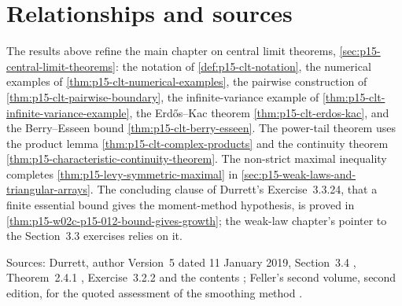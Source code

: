 \section{Relationships and sources}
\label{sec:p15-w02c-p15-015-relationships}

The results above refine the main chapter on central limit theorems,
\cref{sec:p15-central-limit-theorems}: the notation of
\cref{def:p15-clt-notation}, the numerical examples of
\cref{thm:p15-clt-numerical-examples}, the pairwise construction of
\cref{thm:p15-clt-pairwise-boundary}, the infinite-variance example of
\cref{thm:p15-clt-infinite-variance-example}, the Erd\H{o}s--Kac theorem
\cref{thm:p15-clt-erdos-kac}, and the Berry--Esseen bound
\cref{thm:p15-clt-berry-esseen}. The power-tail theorem uses the product
lemma \cref{thm:p15-clt-complex-products} and the continuity theorem
\cref{thm:p15-characteristic-continuity-theorem}. The non-strict maximal
inequality completes \cref{thm:p15-levy-symmetric-maximal} in
\cref{sec:p15-weak-laws-and-triangular-arrays}. The concluding clause of
Durrett's Exercise~3.3.24, that a finite essential bound gives the
moment-method hypothesis, is proved in
\cref{thm:p15-w02c-p15-012-bound-gives-growth}; the weak-law chapter's
pointer to the Section~3.3 exercises relies on it.

Sources: Durrett, author Version~5 dated 11 January 2019,
Section~3.4 \cite[pp.~144--157]{DurrettPTEAuthor2019}, Theorem~2.4.1
\cite[p.~76]{DurrettPTEAuthor2019}, Exercise~3.2.2
\cite[p.~123]{DurrettPTEAuthor2019} and the contents
\cite[p.~182]{DurrettPTEAuthor2019}; Feller's second volume, second
edition, for the quoted assessment of the smoothing method
\cite[ch.~XVI, sec.~5, p.~542, n.~7]{Feller1971ProbabilityII}.
